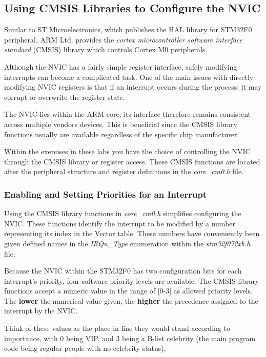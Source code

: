 \documentclass[11pt,fleqn]{book} %
\begin{document}
 
\subsection{Using CMSIS Libraries to Configure the NVIC}
Similar to ST Microelectronics, which publishes the HAL library for STM32F0 peripheral, ARM Ltd. provides the \textit{cortex microcontroller software interface standard} (CMSIS) library which controls Cortex M0 peripherals. 

Although the NVIC has a fairly simple register interface, safely modifying interrupts can become a complicated task. One of the main issues with directly modifying NVIC registers is that if an interrupt occurs during the process, it may corrupt or overwrite the register state.  

The NVIC lies within the ARM core; its interface therefore remains consistent across multiple vendors devices. This is beneficial since the CMSIS library functions usually are available regardless of the specific chip manufacturer. 

Within the exercises in these labs you have the choice of controlling the NVIC through the CMSIS library or register access. These CMSIS functions are located after the peripheral structure and register definitions in the \textit{core\_cm0.h} file. 

\subsubsection{Enabling and Setting Priorities for an Interrupt}

Using the CMSIS library functions in \textit{core\_cm0.h} simplifies configuring the NVIC. These functions identify the interrupt to be modified by a number representing its index in the Vector table. These numbers have conveniently been given defined names in the \textit{IRQn\_Type} enumeration within the \textit{stm32f072xb.h} file.  

Because the NVIC within the STM32F0 has two configuration bits for each interrupt's priority, four software priority levels are available. The CMSIS library functions accept a numeric value in the range of [0-3] as allowed priority levels. The \textbf{lower} the numerical value given, the \textbf{higher} the precedence assigned to the interrupt by the NVIC.

Think of these values as the place in line they would stand according to importance, with 0 being VIP, and 3 being a B-list celebrity (the main program code being regular people with no celebrity status).
\end{document}
